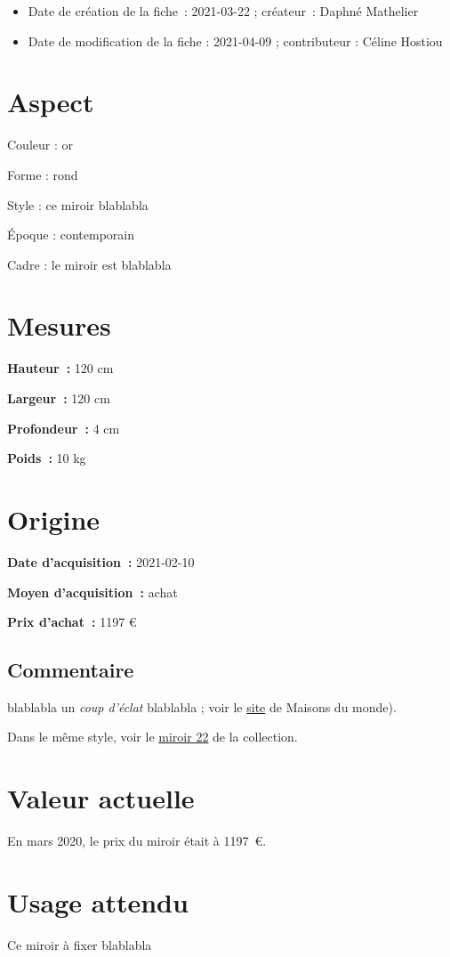 
    

    \begin {itemize}
     
    \item {Date de création de la fiche :} 2021-03-22 ; 
    {créateur :} Daphné Mathelier 
    \item {Date de modification de la fiche :} 2021-04-09 ; 
    {contributeur :} Céline Hostiou
    \end {itemize}
   
     \section* {Aspect}
     {Couleur :} or 

     {Forme :}  rond
     
      {Style :} ce miroir blablabla
        
      {Époque :} contemporain
      
      {Cadre :} le miroir est blablabla
         
    \section* {Mesures}
       
     {\bf \large Hauteur :} 120 cm
    
    {\bf \large Largeur :} 120 cm
     
    {\bf \large Profondeur :} 4 cm
    
    {\bf \large Poids :} 10 kg
     
    \section* {Origine}
    
    {\bf \large Date d’acquisition :} 2021-02-10
    
    {\bf \large Moyen d’acquisition :} achat
    
    {\bf \large Prix d’achat :} 1197 €
        
     \subsection* {Commentaire} blablabla un  {\em coup d’éclat }
     blablabla ; voir le \href{http://www.overleaf.com}{site} de Maisons du monde). 
    
      Dans le même style, voir le  \href{modele.pdf}{miroir 22} de la collection. 
   
      \section* {Valeur actuelle} En mars 2020, le prix du miroir était à 1197 €.
      
      \section* {Usage attendu} Ce miroir à fixer blablabla 
  
    
  
